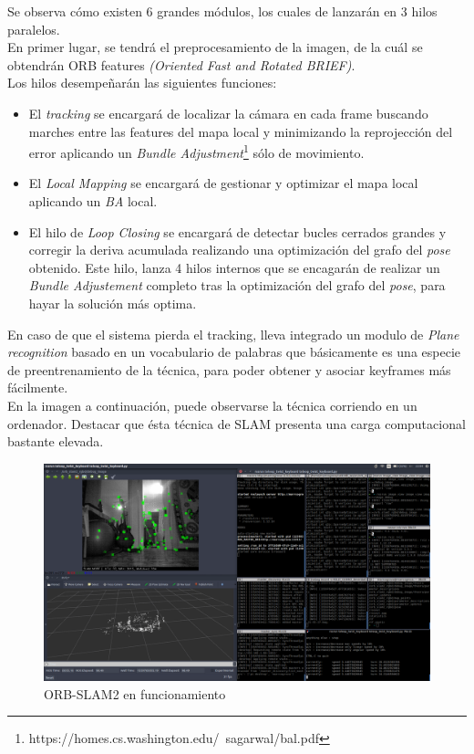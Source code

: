 Se observa cómo existen 6 grandes módulos, los cuales de lanzarán en 3 hilos paralelos. \\
En primer lugar, se tendrá el preprocesamiento de la imagen, de la cuál se obtendrán  ORB features 
\textit{(Oriented Fast and Rotated BRIEF)}. \\
Los hilos desempeñarán las siguientes funciones:
\begin{itemize}
    \item El \textit{tracking} se encargará de localizar la cámara en cada frame buscando marches entre las features
    del mapa local y minimizando la reprojección del error aplicando un \textit{Bundle Adjustment}\footnote{https://homes.cs.washington.edu/~sagarwal/bal.pdf} sólo de 
    movimiento.
    \item El \textit{Local Mapping} se encargará de gestionar y optimizar el mapa local aplicando un \textit{BA} local.
    \item El hilo de \textit{Loop Closing} se encargará de detectar bucles cerrados grandes y corregir la deriva acumulada
    realizando una optimización del grafo del \textit{pose} obtenido. Este hilo, lanza 4 hilos internos que se encagarán de
    realizar un \textit{Bundle Adjustement} completo tras la optimización del grafo del \textit{pose}, para hayar la solución
    más optima.
\end{itemize}

En caso de que el sistema pierda el tracking, lleva integrado un modulo de \textit{Plane recognition} basado en un vocabulario 
de palabras que básicamente es una especie de preentrenamiento de la técnica, para poder obtener y asociar keyframes más fácilmente. \\

En la imagen a continuación, puede observarse la técnica corriendo en un ordenador. Destacar que ésta técnica de SLAM presenta una carga computacional bastante elevada.
\begin{figure}[h!]
    \centering
    \includegraphics[width=1\textwidth]{images/working_zone_orb}
    \caption{ORB-SLAM2 en funcionamiento}
\end{figure}

